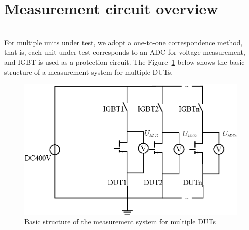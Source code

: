 \section{Measurement circuit overview}
\label{sec:Measurement circuit overview}
\\
For multiple units under test, we adopt a one-to-one correspondence method, that is, each unit under test corresponds to an ADC for voltage measurement, and IGBT is used as a protection circuit.
The Figure~\ref{fig:3.1} below shows the basic structure of a measurement system for multiple DUTs.
\\
\begin{figure}[!ht]
	\centering
	\includegraphics[width=15cm]{grafiken/3.1.eps}
	\caption{Basic structure of the measurement system for multiple DUTs} 
	\label{fig:3.1}
\end{figure}
\FloatBarrier
\\
\\
